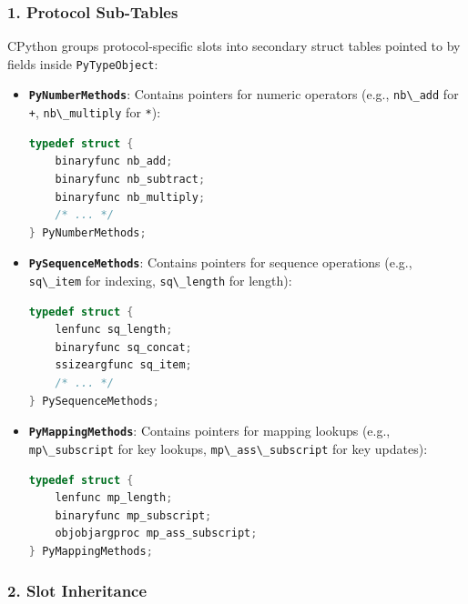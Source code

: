 \hypertarget{protocol-sub-tables}{%
\subsubsection{1. Protocol Sub-Tables}\label{protocol-sub-tables}}

CPython groups protocol-specific slots into secondary struct tables
pointed to by fields inside \passthrough{\lstinline!PyTypeObject!}:

\begin{itemize}
\item
  \textbf{\passthrough{\lstinline!PyNumberMethods!}}: Contains pointers
  for numeric operators (e.g., \passthrough{\lstinline!nb\_add!} for
  \passthrough{\lstinline!+!}, \passthrough{\lstinline!nb\_multiply!}
  for \passthrough{\lstinline!*!}):

\begin{lstlisting}[language=C]
typedef struct {
    binaryfunc nb_add;
    binaryfunc nb_subtract;
    binaryfunc nb_multiply;
    /* ... */
} PyNumberMethods;
\end{lstlisting}
\item
  \textbf{\passthrough{\lstinline!PySequenceMethods!}}: Contains
  pointers for sequence operations (e.g.,
  \passthrough{\lstinline!sq\_item!} for indexing,
  \passthrough{\lstinline!sq\_length!} for length):

\begin{lstlisting}[language=C]
typedef struct {
    lenfunc sq_length;
    binaryfunc sq_concat;
    ssizeargfunc sq_item;
    /* ... */
} PySequenceMethods;
\end{lstlisting}
\item
  \textbf{\passthrough{\lstinline!PyMappingMethods!}}: Contains pointers
  for mapping lookups (e.g., \passthrough{\lstinline!mp\_subscript!} for
  key lookups, \passthrough{\lstinline!mp\_ass\_subscript!} for key
  updates):

\begin{lstlisting}[language=C]
typedef struct {
    lenfunc mp_length;
    binaryfunc mp_subscript;
    objobjargproc mp_ass_subscript;
} PyMappingMethods;
\end{lstlisting}
\end{itemize}

\hypertarget{slot-inheritance}{%
\subsubsection{2. Slot Inheritance}\label{slot-inheritance}}

